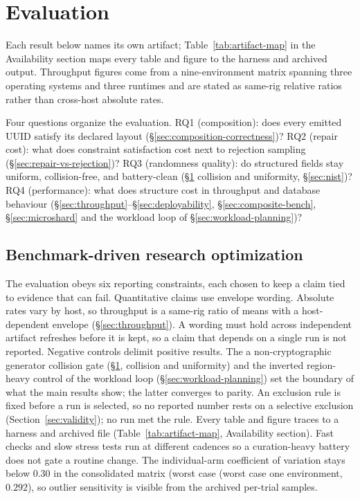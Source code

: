 \documentclass{svproc}
\begin{document}
\section{Evaluation}
\label{sec:evaluation}
Each result below names its own artifact; Table~\ref{tab:artifact-map} in the Availability section maps every table and figure to the harness and archived output. Throughput figures come from a nine-environment matrix spanning three operating systems and three runtimes and are stated as same-rig relative ratios rather than cross-host absolute rates.

Four questions organize the evaluation. RQ1 (composition): does every emitted UUID satisfy its declared layout (\S\ref{sec:composition-correctness})? RQ2 (repair cost): what does constraint satisfaction cost next to rejection sampling (\S\ref{sec:repair-vs-rejection})? RQ3 (randomness quality): do structured fields stay uniform, collision-free, and battery-clean (\S\ref{sec:evaluation} collision and uniformity, \S\ref{sec:nist})? RQ4 (performance): what does structure cost in throughput and database behaviour (\S\ref{sec:throughput}--\S\ref{sec:deployability}, \S\ref{sec:composite-bench}, \S\ref{sec:microshard} and the workload loop of \S\ref{sec:workload-planning})?

\subsection{Benchmark-driven research optimization}
\label{sec:methodology}

The evaluation obeys six reporting constraints, each chosen to keep a claim
tied to evidence that can fail. Quantitative claims use envelope wording.
Absolute rates vary by host, so throughput is a same-rig ratio of means with a
host-dependent envelope (\S\ref{sec:throughput}). A wording must hold across
independent artifact refreshes before it is kept, so a claim that depends on a
single run is not reported. Negative controls delimit positive results. The
a non-cryptographic generator collision gate (\S\ref{sec:evaluation}, collision and
uniformity) and the inverted region-heavy control of the workload loop
(\S\ref{sec:workload-planning}) set the boundary of what the main results show;
the latter converges to parity. An exclusion rule is fixed before a run is
selected, so no reported number rests on a selective exclusion
(Section~\ref{sec:validity}); no run met the rule. Every table and figure traces
to a harness and archived file (Table~\ref{tab:artifact-map}, Availability
section). Fast checks and slow stress tests run at different cadences so a
curation-heavy battery does not gate a routine change. The individual-arm
coefficient of variation stays below $0.30$ in the consolidated matrix (worst case
(worst case one environment, $0.292$), so outlier sensitivity is visible from
the archived per-trial samples.
\end{document}
